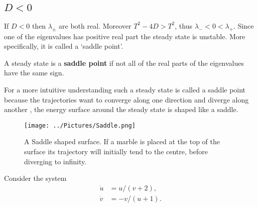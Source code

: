 \subsection{$D<0$}
If $D<0$ then $\lambda_\pm$ are both real. Moreover $T^2-4D>T^2$, thus $\lambda_-<0<\lambda_+$. Since one of the eigenvalues has positive real part the steady state is unstable. More specifically, it is called a `saddle point'.
\begin{defin}
A steady state is a \textbf{saddle point} if not all of the real parts of the eigenvalues have the same sign. 
\end{defin}
For a more intuitive understanding such a steady state is called a saddle point because the trajectories want to converge along one direction and diverge along another , \ie the energy surface around the steady state is shaped like a saddle.
\begin{figure}[!!!h!!!tb]
\centering
\texttt{[image: ../Pictures/Saddle.png]}
\caption{\label{Saddle}A Saddle shaped surface. If a marble is placed at the top of the surface its trajectory will initially tend to the centre, before diverging to infinity.}
\end{figure}
\begin{example}[frametitle=Saddle point]
Consider the system
\begin{align}
\dot{u}&=u/(v+2),\label{Saddle_1}\\
\dot{v}&=-v/(u+1)\label{Saddle_2}.
\end{align}
\end{example}
